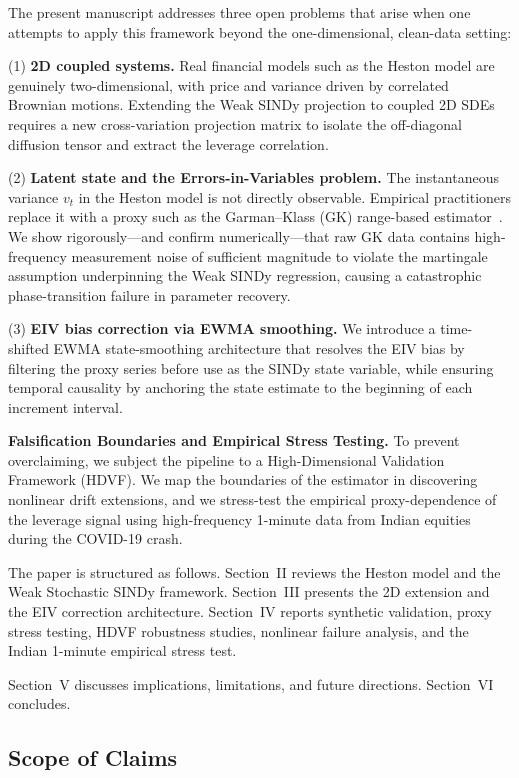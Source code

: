 \documentclass[reprint, amsmath, amssymb, aps, prl, superscriptaddress, nofootinbib]{revtex4-2}
\begin{document}
The present manuscript addresses three open problems that arise when one attempts to
apply this framework beyond the one-dimensional, clean-data setting:

(1) \textbf{2D coupled systems.} Real financial models such as the Heston model
are genuinely two-dimensional, with price and variance driven by correlated Brownian
motions. Extending the Weak SINDy projection to coupled 2D SDEs requires a new
cross-variation projection matrix to isolate the off-diagonal diffusion tensor and
extract the leverage correlation.

(2) \textbf{Latent state and the Errors-in-Variables problem.} The instantaneous
variance $v_t$ in the Heston model is not directly observable. Empirical practitioners
replace it with a proxy such as the Garman--Klass (GK) range-based estimator~\cite{GarmanKlass1980}.
We show rigorously---and confirm numerically---that raw GK data contains high-frequency
measurement noise of sufficient magnitude to violate the martingale assumption
underpinning the Weak SINDy regression, causing a catastrophic phase-transition
failure in parameter recovery.

(3) \textbf{EIV bias correction via EWMA smoothing.} We introduce a time-shifted
EWMA state-smoothing architecture that resolves the EIV bias by filtering the proxy
series before use as the SINDy state variable, while ensuring temporal causality by
anchoring the state estimate to the beginning of each increment interval.

\textbf{Falsification Boundaries and Empirical Stress Testing.} To prevent overclaiming, we subject the pipeline to a High-Dimensional Validation Framework (HDVF). We map the boundaries of the estimator in discovering nonlinear drift extensions, and we stress-test the empirical proxy-dependence of the leverage signal using high-frequency 1-minute data from Indian equities during the COVID-19 crash.

The paper is structured as follows. Section~II reviews the Heston model and the
Weak Stochastic SINDy framework. Section~III presents the 2D extension and the EIV
correction architecture. Section~IV reports synthetic validation, proxy stress testing, HDVF robustness studies, nonlinear failure analysis, and the Indian 1-minute empirical stress test.

Section~V discusses implications, limitations, and future directions. Section~VI concludes.

\subsection{Scope of Claims}
\end{document}
